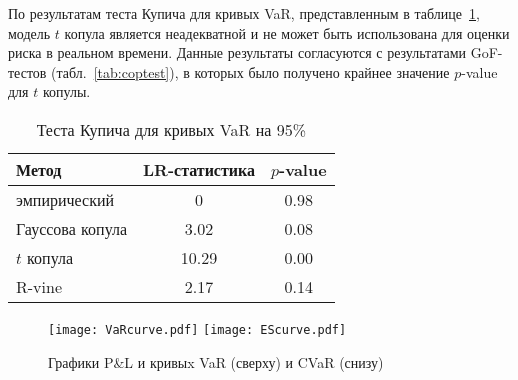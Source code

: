 По результатам теста Купича для кривых VaR, представленным в таблице~\ref{tab:kupiec}, модель $t$ копула является неадекватной и не может быть использована для оценки риска в реальном времени.
Данные результаты согласуются с результатами GoF-тестов (табл.~\ref{tab:coptest}), в которых было получено крайнее значение $p$-value для $t$ копулы.

\begin{table}[h]
    \centering
    \caption{Теста Купича для кривых VaR на 95\%}
    \label{tab:kupiec}
    \setlength{\tabcolsep}{10pt}
    \begin{tabular}{l|c|c} \hline
        Метод & LR-статистика & $p$-value \\ \hline
        эмпирический & 0 & 0.98 \\
        Гауссова копула & 3.02 & 0.08 \\
        $t$ копула & 10.29 & 0.00 \\
        R-vine & 2.17 & 0.14 \\ \hline
    \end{tabular}
\end{table}


\begin{figure}[p]
    \centering
    \texttt{[image: VaRcurve.pdf]}
    \texttt{[image: EScurve.pdf]}
    \caption{Графики P\&L и кривыx VaR (сверху) и CVaR (снизу)}
    \label{ris:VaR-ES-curve}
\end{figure}